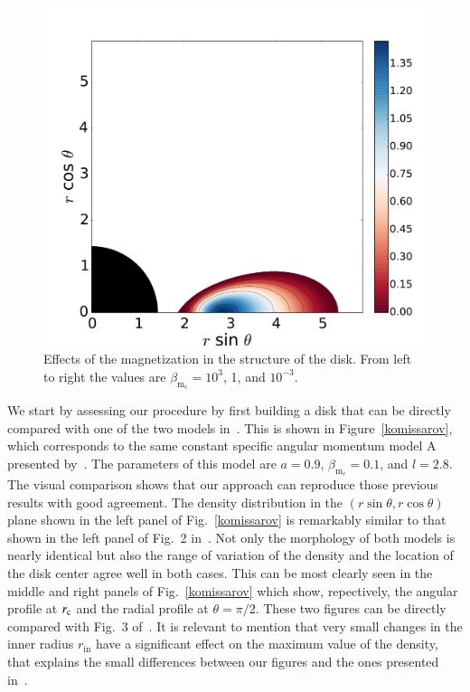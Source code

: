 \documentclass{aa}
\begin{document}
\begin{figure}[t]
\includegraphics[scale=0.16]{figures/fig3c.pdf}
\caption{Effects of the magnetization in the structure of the disk. From left to right the values are $\beta_{\mathrm{m}_{\mathrm{c}}}
=10^3$, 1, and $10^{-3}$.}
\label{magnetization}%
\end{figure}

We start by assessing our procedure by first building a disk that can be directly compared with one of the two models in~\citet{Komissarov:2006}. This is shown in Figure~\ref{komissarov}, which corresponds to the same constant specific angular momentum model A presented by~\citet{Komissarov:2006}. The parameters of this model are $a=0.9$, $\beta_{\mathrm{m}_{\mathrm{c}}}=0.1$, and $l=2.8$.
The visual comparison shows that our approach can reproduce those previous results with good agreement. The density distribution in the $(r\sin\theta,r\cos\theta)$ plane shown in the left panel of Fig.~\ref{komissarov} is remarkably similar to that shown in the left panel of Fig.~2 in~\citet{Komissarov:2006}. Not only the morphology of both models is nearly identical but also the range of variation of the density and the location of the disk center agree well in both cases. This can be most clearly seen in the middle and right panels of Fig.~\ref{komissarov} which show, repectively, the angular profile at $r_{\rm c}$ and the radial profile at $\theta=\pi/2$. These two figures can be directly compared with Fig.~3 of~\citet{Komissarov:2006}. It is relevant to mention that very small changes in the inner radius $r_{\mathrm{in}}$ have a significant effect on the maximum value of the density, that explains the small differences between our figures and the ones presented in~\citet{Komissarov:2006}.
\end{document}
